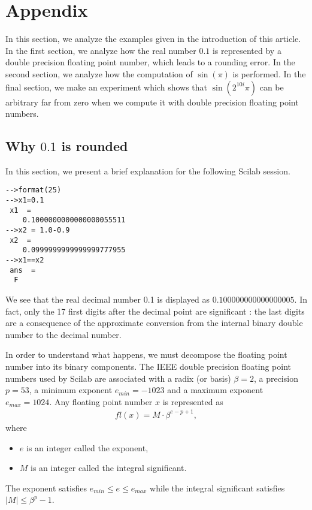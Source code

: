 %


\section{Appendix}

In this section, we analyze the examples given in the introduction of this 
article. In the first section, we analyze how the real number $0.1$ is represented by a double precision
floating point number, which leads to a rounding error. In the second 
section, we analyze how the computation of $\sin(\pi)$ is performed.
In the final section, we make an experiment which shows that $\sin(2^{10i} \pi)$ can 
be arbitrary far from zero when we compute it with double precision floating point 
numbers.

\subsection{Why $0.1$ is rounded}

In this section, we present a brief explanation for the 
following Scilab session.
\begin{lstlisting}
-->format(25)
-->x1=0.1
 x1  =
    0.1000000000000000055511  
-->x2 = 1.0-0.9
 x2  =
    0.0999999999999999777955  
-->x1==x2
 ans  =
  F  
\end{lstlisting}

We see that the real decimal number 0.1 is displayed as $0.100000000000000005$.
In fact, only the 17 first digits after the decimal point are 
significant : the last digits are a consequence of the approximate conversion 
from the internal binary double number to the decimal number.

In order to understand what happens, we must decompose the 
floating point number into its binary components. 
The IEEE double precision floating point numbers used by Scilab 
are associated with a radix (or basis) $\beta=2$, 
a precision $p=53$, a minimum exponent $e_{min}=-1023$
and a maximum exponent $e_{max}=1024$.
Any floating point number $x$ is represented as 
\begin{eqnarray}
fl(x) = M \cdot \beta^{e-p+1},
\end{eqnarray}
where 
\begin{itemize}
\item $e$ is an integer called the exponent, 
\item $M$ is an integer called the integral significant.
\end{itemize}
The exponent satisfies $e_{min}\leq e\leq e_{max}$ while the integral significant 
satisfies $|M| \leq \beta^p - 1$. 

